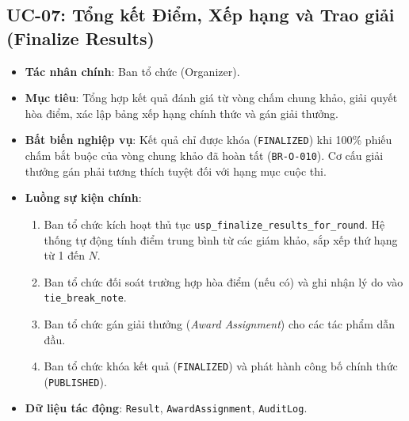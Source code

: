 \subsection{UC-07: Tổng kết Điểm, Xếp hạng và Trao giải (Finalize Results)}
\begin{itemize}
    \item \textbf{Tác nhân chính}: Ban tổ chức (Organizer).
    \item \textbf{Mục tiêu}: Tổng hợp kết quả đánh giá từ vòng chấm chung khảo, giải quyết hòa điểm, xác lập bảng xếp hạng chính thức và gán giải thưởng.
    \item \textbf{Bất biến nghiệp vụ}: Kết quả chỉ được khóa (\texttt{FINALIZED}) khi 100\% phiếu chấm bắt buộc của vòng chung khảo đã hoàn tất (\texttt{BR-O-010}). Cơ cấu giải thưởng gán phải tương thích tuyệt đối với hạng mục cuộc thi.
    \item \textbf{Luồng sự kiện chính}:
    \begin{enumerate}
        \item Ban tổ chức kích hoạt thủ tục \texttt{usp\_finalize\_results\_for\_round}. Hệ thống tự động tính điểm trung bình từ các giám khảo, sắp xếp thứ hạng từ 1 đến $N$.
        \item Ban tổ chức đối soát trường hợp hòa điểm (nếu có) và ghi nhận lý do vào \texttt{tie\_break\_note}.
        \item Ban tổ chức gán giải thưởng (\textit{Award Assignment}) cho các tác phẩm dẫn đầu.
        \item Ban tổ chức khóa kết quả (\texttt{FINALIZED}) và phát hành công bố chính thức (\texttt{PUBLISHED}).
    \end{enumerate}
    \item \textbf{Dữ liệu tác động}: \texttt{Result}, \texttt{AwardAssignment}, \texttt{AuditLog}.
\end{itemize}

